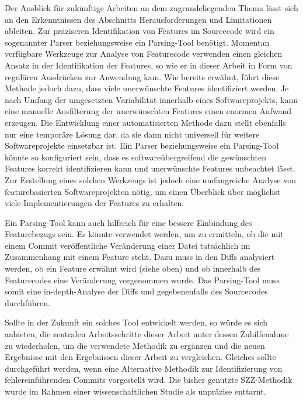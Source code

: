 Der Ausblick für zukünftige Arbeiten an dem zugrundeliegenden Thema lässt sich an den Erkenntnissen des Abschnitts \glqq Herausforderungen und Limitationen\grqq{} ableiten.
Zur präziseren Identifikation von Features im Sourcecode wird ein sogenannter \glqq Parser\grqq{} beziehungsweise ein \glqq Parsing-Tool\grqq{} benötigt. Momentan verfügbare Werkzeuge zur Analyse von Featurecode verwenden einen gleichen Ansatz in der Identifikation der Features, so wie er in dieser Arbeit in Form von regulären Ausdrücken zur Anwendung kam. Wie bereits erwähnt, führt diese Methode jedoch dazu, dass viele unerwünschte Features identifiziert werden. Je nach Umfang der umgesetzten Variabilität innerhalb eines Softwareprojekts, kann eine manuelle Ausfilterung der unerwünschten Features einen enormen Aufwand erzeugen. Die Entwicklung einer automatisierten Methode dazu stellt ebenfalls nur eine temporäre Lösung dar, da sie dann nicht universell für weitere Softwareprojekte einsetzbar ist. Ein Parser beziehungsweise ein Parsing-Tool könnte so konfiguriert sein, dass es softwareübergreifend die gewünschten Features korrekt identifizieren kann und unerwünschte Features unbeachtet lässt. Zur Erstellung eines solchen Werkzeugs ist jedoch eine umfangreiche Analyse von featurebasierten Softwareprojekten nötig, um einen Überblick über möglichst viele Implementierungen der Features zu erhalten.

Ein Parsing-Tool kann auch hilfreich für eine bessere Einbindung des Featurebezugs sein. Es könnte verwendet werden, um zu ermitteln, ob die mit einem Commit veröffentliche Veränderung einer Datei tatsächlich im Zusammenhang mit einem Feature steht. Dazu muss in den Diffs analysiert werden, ob ein Feature erwähnt wird (siehe oben) und ob innerhalb des Featurecodes eine Veränderung vorgenommen wurde. Das Parsing-Tool muss somit eine \glqq in-depth\grqq -Analyse der Diffs und gegebenenfalls des Sourcecodes durchführen.

Sollte in der Zukunft ein solches Tool entwickelt werden, so würde es sich anbieten, die zentralen Arbeitsschritte dieser Arbeit unter dessen Zuhilfenahme zu wiederholen, um die verwendete Methodik zu ergänzen und die neuen Ergebnisse mit den Ergebnissen dieser Arbeit zu vergleichen. Gleiches sollte durchgeführt werden, wenn eine Alternative Methodik zur Identifizierung von fehlereinführenden Commits vorgestellt wird. Die bisher genutzte SZZ-Methodik wurde im Rahmen einer wissenschaftlichen Studie als unpräzise \glqq enttarnt\grqq.

\cleardoublepage